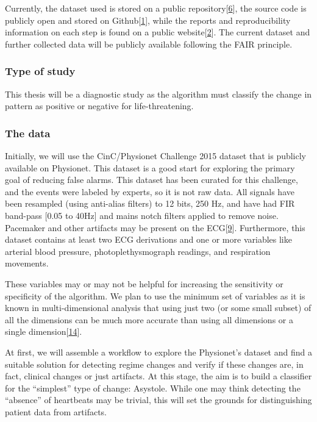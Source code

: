\documentclass[runningheads]{llncs}
\begin{document}
Currently, the dataset used is stored on a public
repository{[}\protect\hyperlink{ref-franz_dataset}{6}{]}, the source
code is publicly open and stored on
Github{[}\protect\hyperlink{ref-franz_github}{1}{]}, while the reports
and reproducibility information on each step is found on a public
website{[}\protect\hyperlink{ref-franz_website}{2}{]}. The current
dataset and further collected data will be publicly available following
the FAIR principle.

\hypertarget{type-of-study}{%
\subsubsection{Type of study}\label{type-of-study}}

This thesis will be a diagnostic study as the algorithm must classify
the change in pattern as positive or negative for life-threatening.

\hypertarget{the-data}{%
\subsubsection{The data}\label{the-data}}

Initially, we will use the CinC/Physionet Challenge 2015 dataset that is
publicly available on Physionet. This dataset is a good start for
exploring the primary goal of reducing false alarms. This dataset has
been curated for this challenge, and the events were labeled by experts,
so it is not raw data. All signals have been resampled (using anti-alias
filters) to 12 bits, 250 Hz, and have had FIR band-pass {[}0.05 to
40Hz{]} and mains notch filters applied to remove noise. Pacemaker and
other artifacts may be present on the
ECG{[}\protect\hyperlink{ref-Clifford2015}{9}{]}. Furthermore, this
dataset contains at least two ECG derivations and one or more variables
like arterial blood pressure, photoplethysmograph readings, and
respiration movements.

These variables may or may not be helpful for increasing the sensitivity
or specificity of the algorithm. We plan to use the minimum set of
variables as it is known in multi-dimensional analysis that using just
two (or some small subset) of all the dimensions can be much more
accurate than using all dimensions or a single
dimension{[}\protect\hyperlink{ref-gharghabi2018}{14}{]}.

At first, we will assemble a workflow to explore the Physionet's dataset
and find a suitable solution for detecting regime changes and verify if
these changes are, in fact, clinical changes or just artifacts. At this
stage, the aim is to build a classifier for the ``simplest'' type of
change: Asystole. While one may think detecting the ``absence'' of
heartbeats may be trivial, this will set the grounds for distinguishing
patient data from artifacts.
\end{document}
